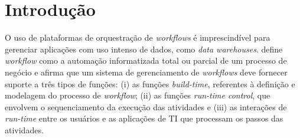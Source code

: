 \chapter{Introdução}






O uso de plataformas de orquestração de \textit{workflows} é imprescindível para gerenciar aplicações com uso intenso de dados, como \textit{data warehouses}. \cite{hollingsworth1995workflow} define \textit{workflow} como a automação informatizada total ou parcial de um processo de negócio e afirma que um sistema de gerenciamento de \textit{workflows} deve fornecer suporte a três tipos de funções: (i) as funções \textit{build-time}, referentes à definição e modelagem do processo de \textit{workflow}; (ii) as funções \textit{run-time control}, que envolvem o sequenciamento da execução das atividades e (iii) as interações de \textit{run-time} entre os usuários e as aplicações de TI que processam os passos das atividades.

